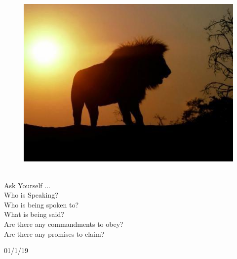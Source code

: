 \documentclass[10pt,landscape,twocolumn,letterpaper]{article}
\begin{document}
\begin{figure}[htp]
    \centering
  \includegraphics[width=4.5in]{March}\\
\end{figure}

\begin{center}
\textcolor[rgb]{0.00,0.00,1.00}{\\Ask Yourself ...}
\textcolor[rgb]{1.00,0.00,0.00}{\\Who is Speaking?\\Who is being spoken to?\\What is being said?\\Are there
any commandments to obey?\\Are there any promises to claim?}
\end{center}

\hfill \tiny{\textcolor[rgb]{0.50,0.50,0.50}{01/1/19}}
\end{document}
